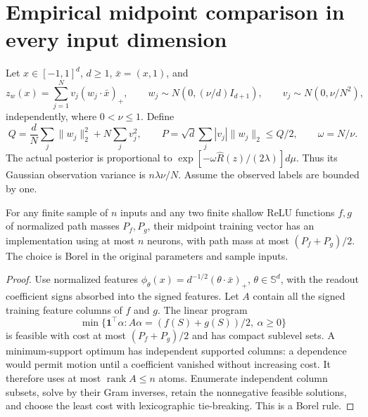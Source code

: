 \section{Empirical midpoint comparison in every input dimension}
Let $x\in[-1,1]^d$, $d\ge1$, $\bar x=(x,1)$, and
\[
 z_w(x)=\sum_{j=1}^N v_j(w_j\cdot\bar x)_+,
 \qquad w_j\sim N(0,(\nu/d)I_{d+1}),\qquad
 v_j\sim N(0,\nu/N^2),
\]
independently, where $0<\nu\le1$. Define
\[
 Q=\frac dN\sum_j\|w_j\|_2^2+N\sum_jv_j^2,
 \qquad P=\sqrt d\sum_j|v_j|\|w_j\|_2\le Q/2,
 \qquad\omega=N/\nu.
\]
The actual posterior is proportional to
$\exp[-\omega\widehat R(z)/(2\lambda)]d\mu$.
Thus its Gaussian observation variance is $n\lambda\nu/N$.
Assume the observed labels are bounded by one.

\begin{lemma}
For any finite sample of $n$ inputs and any two finite shallow ReLU
functions $f,g$ of normalized path masses $P_f,P_g$, their midpoint
training vector has an implementation using at most $n$ neurons,
with path mass at most $(P_f+P_g)/2$. The choice is Borel in the
original parameters and sample inputs.
\end{lemma}
\begin{proof}
Use normalized features
$\phi_\theta(x)=d^{-1/2}(\theta\cdot\bar x)_+$,
$\theta\in\mathbb S^d$, with the readout coefficient signs absorbed
into the signed features. Let $A$ contain all the signed training
feature columns of $f$ and $g$. The linear program
\[
 \min\{\boldsymbol1^\top\alpha:A\alpha=(f(S)+g(S))/2,
                                  \ \alpha\ge0\}
\]
is feasible with cost at most $(P_f+P_g)/2$ and has compact sublevel
sets. A minimum-support optimum has independent supported columns:
a dependence would permit motion until a coefficient vanished without
increasing cost. It therefore uses at most $\operatorname{rank}A\le n$
atoms. Enumerate independent column subsets, solve by their Gram
inverses, retain the nonnegative feasible solutions, and choose the
least cost with lexicographic tie-breaking. This is a Borel rule.
\end{proof}

